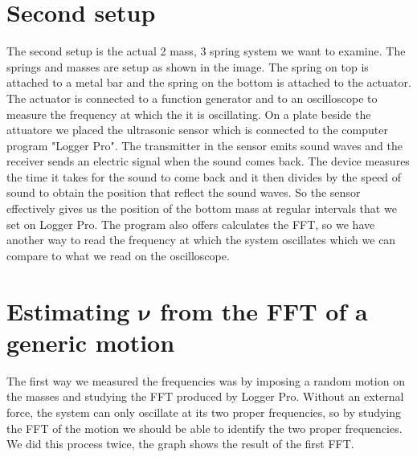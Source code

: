 \documentclass{article}
\begin{document}
\section{Second setup} \label{sec:setup2}
The second setup is the actual 2 mass, 3 spring system we want to examine. The springs and masses are setup as shown in the image. 
The spring on top is attached to a metal bar and the spring on the bottom is attached to the actuator. The actuator is connected to a function generator and to an oscilloscope to measure the frequency at which the it is oscillating. On a plate beside the attuatore we placed the ultrasonic sensor which is connected to the computer program "Logger Pro". The transmitter in the sensor emits sound waves and the receiver sends an electric signal when the sound comes back. The device measures the time it takes for the sound to come back and it then divides by the speed of sound to obtain the position that reflect the sound waves. So the sensor effectively gives us the position of the bottom mass at regular intervals that we set on Logger Pro. The program also offers calculates the FFT, so we have another way to read the frequency at which the system oscillates which we can compare to what we read on the oscilloscope. 


\section{Estimating $\bm \nu$ from the FFT of a generic motion}
The first way we measured the frequencies was by imposing a random motion on the masses and studying the FFT produced by Logger Pro. Without an external force, the system can only oscillate at its two proper frequencies, so by studying the FFT of the motion we should be able to identify the two proper frequencies. We did this process twice, the graph shows the result of the first FFT. 
\end{document}

